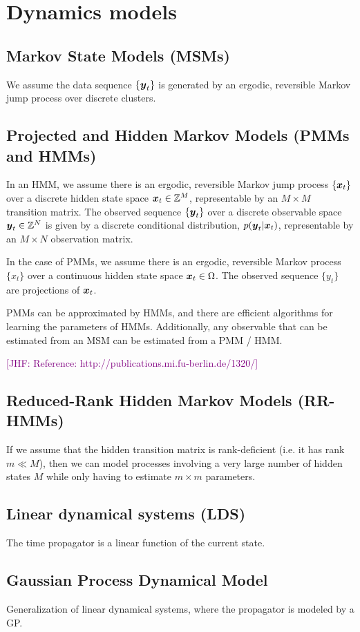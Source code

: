 \documentclass[aps,prl,preprint,nofootinbib,superscriptaddress,linenumbers]{revtex4-1}
\newcommand{\bfv}[1]{{\mbox{\boldmath{$#1$}}}}
\newcommand{\x}{\bfv{x}}
\newcommand{\y}{\bfv{y}}
\newcommand{\jhfcomment}[1]{\textcolor{purple}{[JHF: #1]}} 	%
\begin{document}
\section{Dynamics models}

\subsection{Markov State Models (MSMs)}
We assume the data sequence $\{ \y_t \}$ is generated by an ergodic, reversible Markov jump process over discrete clusters.

\subsection{Projected and Hidden Markov Models (PMMs and HMMs)}
In an HMM, we assume there is an ergodic, reversible Markov jump process $\{ \x_t \}$ over a discrete hidden state space $\x_t \in \mathbb{Z}^M$, representable by an $M\times M$ transition matrix. The observed sequence $\{ \y_t \}$ over a discrete observable space $\y_t \in \mathbb{Z}^N$ is given by a discrete conditional distribution, $ p(\y_t | \x_t)$, representable by an $M \times N$ observation matrix.

In the case of PMMs, we assume there is an ergodic, reversible Markov process $\{ x_t \}$ over a continuous hidden state space $\x_t \in \Omega$. The observed sequence $\{y_t\}$ are projections of $\x_t$.

PMMs can be approximated by HMMs, and there are efficient algorithms for learning the parameters of HMMs. Additionally, any observable that can be estimated from an MSM can be estimated from a PMM / HMM.

\jhfcomment{Reference: http://publications.mi.fu-berlin.de/1320/}

\subsection{Reduced-Rank Hidden Markov Models (RR-HMMs)}
If we assume that the hidden transition matrix is rank-deficient (i.e. it has rank $m \ll M$), then we can model processes involving a very large number of hidden states $M$ while only having to estimate $m \times m$ parameters.

\subsection{Linear dynamical systems (LDS)}
The time propagator is a linear function of the current state.

\subsection{Gaussian Process Dynamical Model}
Generalization of linear dynamical systems, where the propagator is modeled by a GP.
\end{document}
